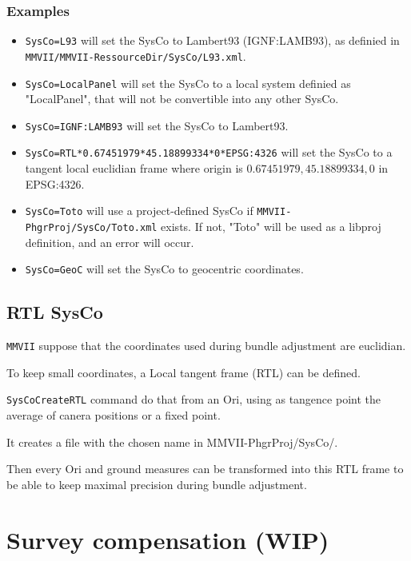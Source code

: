 \subsection{Examples}
\begin{itemize}
\item {\tt SysCo=L93} will set the SysCo to Lambert93 (IGNF:LAMB93), as definied in \\
{\tt MMVII/MMVII-RessourceDir/SysCo/L93.xml}.
\item {\tt SysCo=LocalPanel} will set the SysCo to a local system definied as "LocalPanel", that will not be convertible into any other SysCo.
\item {\tt SysCo=IGNF:LAMB93} will set the SysCo to Lambert93.
\item {\tt SysCo=RTL*0.67451979*45.18899334*0*EPSG:4326} will set the SysCo to a tangent local euclidian frame where origin is $0.67451979, 45.18899334, 0$ in EPSG:4326.
\item {\tt SysCo=Toto} will use a project-defined SysCo if {\tt MMVII-PhgrProj/SysCo/Toto.xml} exists. If not, "Toto" will be used as a libproj definition, and an error will occur.
\item {\tt SysCo=GeoC} will set the SysCo to geocentric coordinates.

\end{itemize}


\section{RTL SysCo}
\label{SysCoRTL}
{\tt MMVII} suppose that the coordinates used during bundle adjustment are euclidian.

To keep small coordinates, a Local tangent frame (RTL) can be defined.

{\tt SysCoCreateRTL} command do that from an Ori, using as tangence point the average of canera positions or a fixed point.

It creates a file with the chosen name in {MMVII-PhgrProj/SysCo/}.

Then every Ori and ground measures can be transformed into this RTL frame to be able to keep maximal precision during bundle adjustment.




\chapter{Survey compensation (WIP)}
\label{Chap:TopoUser}


